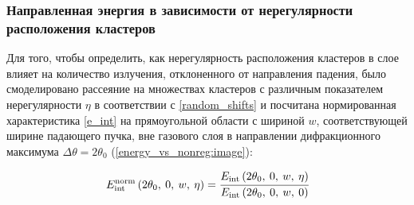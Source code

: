 


\subsubsection{Направленная энергия в зависимости от нерегулярности расположения кластеров}

Для того, чтобы определить, как нерегулярность расположения кластеров в слое влияет на количество излучения, отклоненного от направления падения, было смоделировано рассеяние на множествах кластеров с различным показателем нерегулярности $\eta$ в соответствии с \autoref{random_shifts} и посчитана нормированная характеристика \autoref{e_int} на прямоугольной области с шириной $w$, соответствующей ширине падающего пучка, вне газового слоя в направлении дифракционного максимума $\Delta\theta = 2\theta_0$ (\autoref{energy_vs_nonreg:image}):

    \begin{equation}
        E_{\textrm{int}}^{\textrm{norm}} \left( 2\theta_0,\: 0, \:w, \:\eta\right) = \cfrac{E_{\textrm{int}} \left( 2\theta_0,\: 0, \:w, \:\eta\right)}{E_{\textrm{int}} \left( 2\theta_0,\: 0, \:w, \:0\right)}
        \label{integrate_sc_E}
    \end{equation}